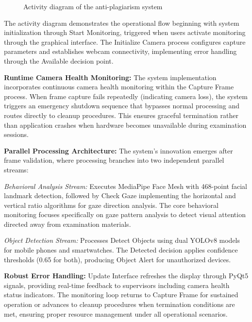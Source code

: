 \documentclass[conference]{IEEEtran}
\begin{document}
\begin{figure}[H]
    \caption{Activity diagram of the anti-plagiarism system}
\end{figure}

The activity diagram demonstrates the operational flow beginning with system 
initialization through Start Monitoring, triggered when users activate monitoring 
through the graphical interface. The Initialize Camera process configures capture 
parameters and establishes webcam connectivity, implementing error handling through 
the Available decision point.

\textbf{Runtime Camera Health Monitoring:} The system implementation incorporates 
continuous camera health monitoring within the Capture Frame process. When frame 
capture fails repeatedly (indicating camera loss), the system triggers an emergency 
shutdown sequence that bypasses normal processing and routes directly to cleanup 
procedures. This ensures graceful termination rather than application crashes when 
hardware becomes unavailable during examination sessions.

\textbf{Parallel Processing Architecture:} The system's innovation emerges after 
frame validation, where processing branches into two independent parallel streams:

\textit{Behavioral Analysis Stream:} Executes MediaPipe Face Mesh with 468-point 
facial landmark detection, followed by Check Gaze implementing the horizontal and 
vertical ratio algorithms for gaze direction analysis. The core behavioral monitoring 
focuses specifically on gaze pattern analysis to detect visual attention directed 
away from examination materials.

\textit{Object Detection Stream:} Processes Detect Objects using dual YOLOv8 models 
for mobile phones and smartwatches. The Detected decision applies confidence thresholds 
(0.65 for both), producing Object Alert for unauthorized devices.

\textbf{Robust Error Handling:} Update Interface refreshes the display through PyQt5 
signals, providing real-time feedback to supervisors including camera health status 
indicators. The monitoring loop returns to Capture Frame for sustained operation or 
advances to cleanup procedures when termination conditions are met, ensuring proper 
resource management under all operational scenarios.
\end{document}
